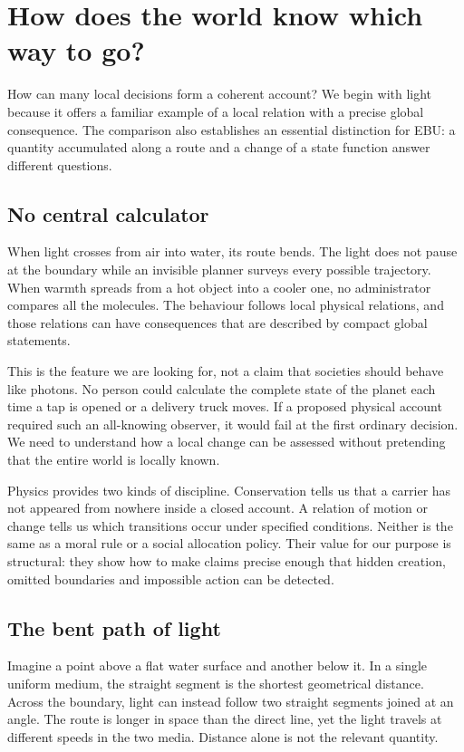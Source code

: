 \chapter{How does the world know which way to go?}\label{ch:research}

How can many local decisions form a coherent account? We begin with light because it offers a familiar example of a local relation with a precise global consequence. The comparison also establishes an essential distinction for EBU: a quantity accumulated along a route and a change of a state function answer different questions.


\section{No central calculator}
When light crosses from air into water, its route bends. The light does not pause at the boundary while an invisible planner surveys every possible trajectory. When warmth spreads from a hot object into a cooler one, no administrator compares all the molecules. The behaviour follows local physical relations, and those relations can have consequences that are described by compact global statements.

This is the feature we are looking for, not a claim that societies should behave like photons. No person could calculate the complete state of the planet each time a tap is opened or a delivery truck moves. If a proposed physical account required such an all-knowing observer, it would fail at the first ordinary decision. We need to understand how a local change can be assessed without pretending that the entire world is locally known.

Physics provides two kinds of discipline. Conservation tells us that a carrier has not appeared from nowhere inside a closed account. A relation of motion or change tells us which transitions occur under specified conditions. Neither is the same as a moral rule or a social allocation policy. Their value for our purpose is structural: they show how to make claims precise enough that hidden creation, omitted boundaries and impossible action can be detected.

\section{The bent path of light}
Imagine a point above a flat water surface and another below it. In a single uniform medium, the straight segment is the shortest geometrical distance. Across the boundary, light can instead follow two straight segments joined at an angle. The route is longer in space than the direct line, yet the light travels at different speeds in the two media. Distance alone is not the relevant quantity.

